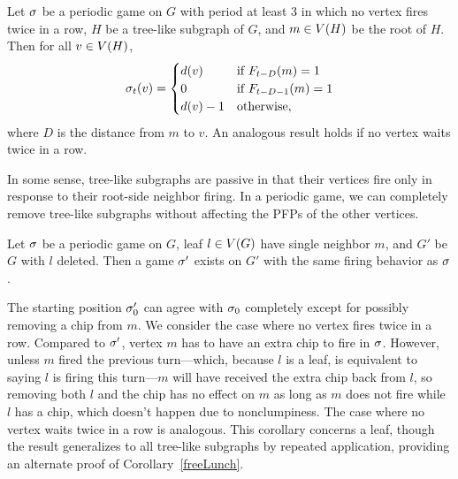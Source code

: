 \begin{cor}
Let $\s$ be a periodic game on $G$ with period at least 3 in which no vertex
fires twice in a row, $H$ be a tree-like subgraph of $G$, and $m \in \V[H]$ be
the root of $H$. Then for all $v \in \V[H]$,
\[
  \chips{v}{t} = \begin{cases}
    \deg{v} & \textnormal{if } \firing{m}{t-D} = 1 \\
    0 & \textnormal{if } \firing{m}{t-D-1} = 1 \\
    \deg{v} - 1 & \textnormal{otherwise},
  \end{cases}
\]
where $D$ is the distance from $m$ to $v$. An analogous result holds if no
vertex waits twice in a row.
\end{cor}

In some sense, tree-like subgraphs are passive in that their vertices fire only
in response to their root-side neighbor firing. In a periodic game, we can
completely remove tree-like subgraphs without affecting the PFPs of the other
vertices.

\begin{cor}
Let $\s$ be a periodic game on $G$, leaf $l \in \V$ have single neighbor $m$,
and $G'$ be $G$ with $l$ deleted. Then a game $\s'$ exists on $G'$ with the
same firing behavior as $\s$.
\end{cor}

The starting position $\pos[\s']{0}$ can agree with $\pos{0}$ completely except
for possibly removing a chip from $m$. We consider the case where no vertex
fires twice in a row. Compared to $\s'$, vertex $m$ has to have an extra chip
to fire in $\s$.  However, unless $m$ fired the previous turn---which, because
$l$ is a leaf, is equivalent to saying $l$ is firing this turn---$m$ will have
received the extra chip back from $l$, so removing both $l$ and the chip has no
effect on $m$ as long as $m$ does not fire while $l$ has a chip, which doesn't
happen due to nonclumpiness. The case where no vertex waits twice in a row is
analogous. This corollary concerns a leaf, though the result generalizes to all
tree-like subgraphs by repeated application, providing an alternate proof of
Corollary~\ref{freeLunch}.
